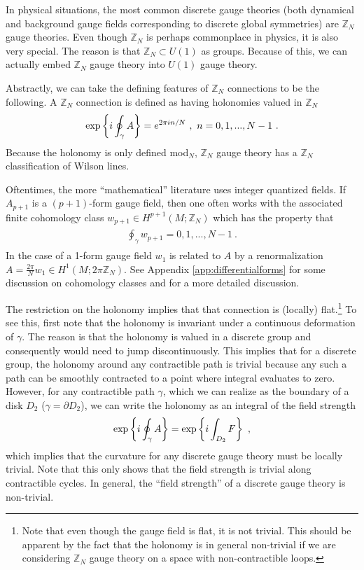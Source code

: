 \documentclass[11pt]{article}
\newcommand{\eq}[1]{\begin{align}\begin{split}#1\end{split}\end{align}}
\def\IZ{{\mathbb{Z}}}
\begin{document}
In physical situations, the most common discrete gauge theories (both dynamical and background gauge fields corresponding to discrete global symmetries) are $\IZ_N$ gauge theories. Even though $\IZ_N$ is perhaps commonplace in physics, it is also very special. The reason is that $\IZ_N\subset U(1)$ as groups. Because of this, we can actually embed $\IZ_N$ gauge theory into $U(1)$ gauge theory.


Abstractly, we can take the defining features of $\IZ_N$ connections to be the following. A $\IZ_N$ connection is defined as having holonomies valued in $\IZ_N$
\eq{
{\rm exp}\left\{i \oint_\gamma A\right\}=e^{2\pi i n/N}~,~n=0,1,...,N-1~.
}
Because the holonomy is only defined mod$_N$, $\IZ_N$ gauge theory has a $\IZ_N$ classification of Wilson lines. 

Oftentimes, the more ``mathematical'' literature uses integer quantized fields. If $A_{p+1}$ is a $(p+1)$-form gauge field, then one often works with the associated finite cohomology class  $w_{p+1}\in H^{p+1}(M;\IZ_N)$ which has the property that 
\eq{
\oint_\gamma w_{p+1}=0,1,...,N-1~.
}
In the case of a 1-form gauge field $w_{1}$ is related to $A$ by a renormalization $A=\frac{2\pi}{N} w_1\in H^1(M;2\pi \IZ_N)$. 
See Appendix \ref{app:differentialforms} for some discussion on cohomology classes and \cite{Nakahara:2003nw} for a more detailed discussion. 



The restriction on the holonomy implies that that connection is (locally) flat.\footnote{Note that even though the gauge field is flat, it is not trivial. This should be apparent by the fact that the holonomy is in general non-trivial if we are considering $\IZ_N$ gauge theory on a space with non-contractible loops.}  To see this, first note that the holonomy is invariant under a continuous deformation of $\gamma$. The reason is that the holonomy is valued in a discrete group and consequently would need to jump discontinuously.  This implies that for a discrete group, the holonomy around any contractible path is trivial because any such a path can be smoothly contracted to a point where integral evaluates to zero. However, for  any contractible path $\gamma$, which we can realize  as the boundary of a disk $D_2$ ($\gamma=\partial D_2$), we can write the holonomy as an integral of the field strength 
\eq{
{\rm exp}\left\{i \oint_\gamma A\right\}={\rm exp}\left\{i \int_{D_2}F\right\}~,
} 
which implies that the curvature for any discrete gauge theory must be locally trivial.  Note that  this only shows that the field strength is trivial along contractible cycles. In general, the ``field strength'' of a discrete gauge theory is non-trivial. 
\end{document}
